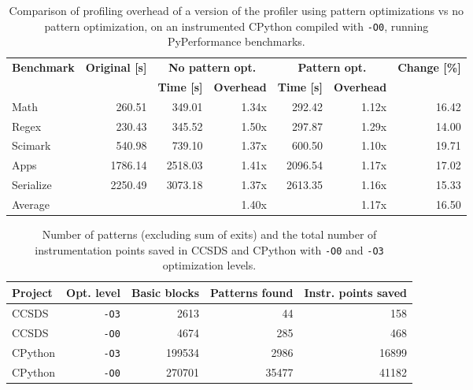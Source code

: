 \begin{table}[]
    \centering
    {\small\begin{tabular}{lrrrrrr}
    \multicolumn{1}{l}{\multirow{2}{*}{\textbf{Benchmark}}} & \multicolumn{1}{c}{\multirow{2}{*}{\textbf{Original [s]}}} & \multicolumn{2}{c}{\textbf{No pattern opt.}} & \multicolumn{2}{c}{\textbf{Pattern opt.}} & 
    \multicolumn{1}{l}{\multirow{2}{*}{\textbf{Change [\%]}}} \\
    \cline{3-6} 
    \multicolumn{1}{l}{} & \multicolumn{1}{c}{} & \multicolumn{1}{c}{\textbf{Time [s]}} & \multicolumn{1}{c}{\textbf{Overhead}} & \multicolumn{1}{c}{\textbf{Time [s]}} & \multicolumn{1}{c}{\textbf{Overhead}} \\ 
    \hline
    \hline
    Math & 260.51 & 349.01 & 1.34x & 292.42 & 1.12x & 16.42 \\
    Regex & 230.43 & 345.52 & 1.50x  & 297.87 & 1.29x & 14.00 \\
    Scimark & 540.98 & 739.10 & 1.37x & 600.50 & 1.10x & 19.71 \\
    Apps & 1786.14 & 2518.03 & 1.41x & 2096.54 & 1.17x & 17.02 \\
    Serialize & 2250.49 & 3073.18 & 1.37x & 2613.35 & 1.16x & 15.33 \\
    \hline
    \multicolumn{1}{l}{Average} & & & 1.40x & & 1.17x & 16.50 \\
    \end{tabular}
    }
    \caption{Comparison of profiling overhead of a version of the profiler using pattern optimizations vs no pattern optimization, on an instrumented CPython compiled with \texttt{-O0}, running PyPerformance benchmarks.}
    \label{tab:cpython-patterns-O0}
\end{table}



\begin{table}[]
    \centering
    \begin{tabular}{lrrrr}
         \textbf{Project} & \textbf{Opt. level} & \textbf{Basic blocks} & \textbf{Patterns found} & \textbf{Instr. points saved} \\
         \hline
         \hline
         CCSDS & \texttt{-O3} & 2613 & 44 & 158 \\
         CCSDS & \texttt{-O0} & 4674 & 285 & 468  \\ 
         CPython & \texttt{-O3} & 199534 & 2986 & 16899 \\ 
         CPython & \texttt{-O0} & 270701 & 35477 & 41182 \\ 

    \end{tabular}
    \caption{Number of patterns (excluding sum of exits) and the total number of instrumentation points saved in CCSDS and CPython with \texttt{-O0} and \texttt{-O3} optimization levels.}
    \label{tab:num-patterns}
\end{table}


